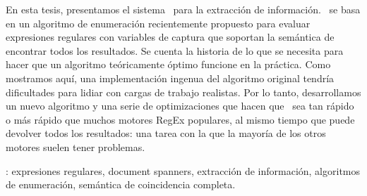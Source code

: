 En esta tesis, presentamos el sistema \rematch\ para la extracción de información. \rematch\ se basa en un algoritmo de enumeración recientemente propuesto para evaluar expresiones regulares con variables de captura que soportan la semántica de encontrar todos los resultados. Se cuenta la historia de lo que se necesita para hacer que un algoritmo teóricamente óptimo funcione en la práctica. Como mostramos aquí, una implementación ingenua del algoritmo original tendría dificultades para lidiar con cargas de trabajo realistas. Por lo tanto, desarrollamos un nuevo algoritmo y una serie de optimizaciones que hacen que \rematch\ sea tan rápido o más rápido que muchos motores RegEx populares, al mismo tiempo que puede devolver todos los resultados: una tarea con la que la mayoría de los otros motores suelen tener problemas. \

\vfill
{}: expresiones regulares, document spanners, extracción de información, algoritmos de enumeración, semántica de coincidencia completa.
